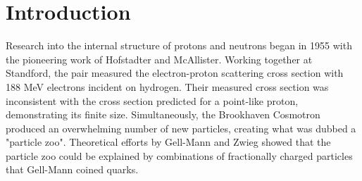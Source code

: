 

%


% 


\chapter{Introduction}
Research into the internal structure of protons and neutrons began in 1955 with the pioneering work of Hofstadter and McAllister.  Working together at Standford, the pair measured the electron-proton scattering cross section with 188 MeV electrons incident on hydrogen. Their measured cross section was inconsistent with the cross section predicted for a point-like proton, demonstrating its finite size.  Simultaneously, the Brookhaven Cosmotron produced an overwhelming number of new particles, creating what was dubbed a "particle zoo".  Theoretical efforts by Gell-Mann and Zwieg showed that the particle zoo could be explained by combinations of fractionally charged particles that Gell-Mann coined quarks.  

